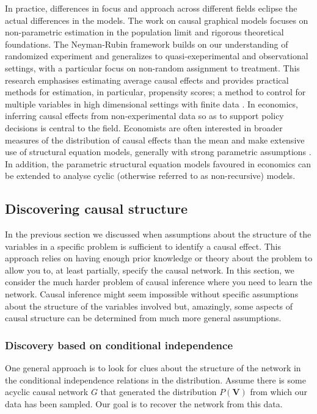 \documentclass[11pt,a4paper]{article}
\begin{document}
In practice, differences in focus and approach across different fields eclipse the actual differences in the models. The work on causal graphical models \cite{Pearl2000,Sprites} focuses on non-parametric estimation in the population limit and rigorous theoretical foundations. The Neyman-Rubin framework builds on our understanding of randomized experiment and generalizes to quasi-exeperimental and observational settings, with a particular focus on non-random assignment to treatment. This research emphasises estimating average causal effects and provides practical methods for estimation, in particular, propensity scores; a method to control for multiple variables in high dimensional settings with finite data \cite{Rosenbaum1983}. In economics, inferring causal effects from non-experimental data so as to support policy decisions is central to the field. Economists are often interested in broader measures of the distribution of causal effects than the mean and make extensive use of structural equation models, generally with strong parametric assumptions \cite{Heckman2008}. In addition, the parametric structural equation models favoured in economics can be extended to analyse cyclic (otherwise referred to as non-recursive) models. 


\subsection{Discovering causal structure}

In the previous section we discussed when assumptions about the structure of the variables in a specific problem is sufficient to identify a causal effect. This approach relies on having enough prior knowledge or theory about the problem to allow you to, at least partially, specify the causal network. In this section, we consider the much harder problem of causal inference where you need to learn the network. Causal inference might seem impossible without specific assumptions about the structure of the variables involved but, amazingly, some aspects of causal structure can be determined from much more general assumptions.  

 
\subsubsection{Discovery based on conditional independence}
One general approach is to look for clues about the structure of the network in the conditional independence relations in the distribution. Assume there is some acyclic causal network $G$ that generated the distribution $P(\boldsymbol{V})$ from which our data has been sampled. Our goal is to recover the network from this data. 
\end{document}
